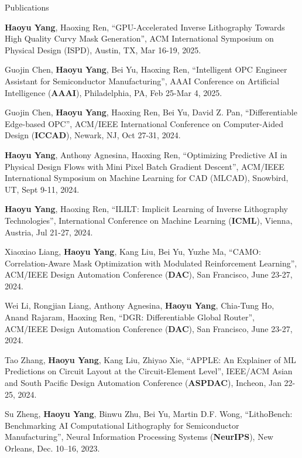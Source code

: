 \begin{rSection}{Publications}
\begin{description}[font=\normalfont]
	\item[{[C38]}] \textbf{Haoyu Yang}, Haoxing Ren, ``GPU-Accelerated Inverse Lithography Towards High Quality Curvy Mask Generation'', ACM International Symposium on Physical Design (ISPD), Austin, TX, Mar 16-19, 2025.
	
	\item[{[C37]}] Guojin Chen, \textbf{Haoyu Yang}, Bei Yu, Haoxing Ren, ``Intelligent OPC Engineer Assistant for Semiconductor Manufacturing'', AAAI Conference on Artificial Intelligence (\textbf{AAAI}), Philadelphia, PA, Feb 25-Mar 4, 2025.
	
	\item[{[C36]}] Guojin Chen, \textbf{Haoyu Yang}, Haoxing Ren, Bei Yu, David Z. Pan, ``Differentiable Edge-based OPC'', ACM/IEEE International Conference on Computer-Aided Design (\textbf{ICCAD}), Newark, NJ, Oct 27-31, 2024.
	
	\item[{[C35]}] \textbf{Haoyu Yang}, Anthony Agnesina, Haoxing Ren, ``Optimizing Predictive AI in Physical Design Flows with Mini Pixel Batch Gradient Descent'', ACM/IEEE International Symposium on Machine Learning for CAD (MLCAD), Snowbird, UT, Sept 9-11, 2024.
	
	\item[{[C34]}] \textbf{Haoyu Yang}, Haoxing Ren, ``ILILT: Implicit Learning of Inverse Lithography Technologies'', International Conference on Machine Learning (\textbf{ICML}), Vienna, Austria, Jul 21-27, 2024.
	
	\item[{[C33]}] Xiaoxiao Liang, \textbf{Haoyu Yang}, Kang Liu, Bei Yu, Yuzhe Ma, ``CAMO: Correlation-Aware Mask Optimization with Modulated Reinforcement Learning'', ACM/IEEE Design Automation Conference (\textbf{DAC}), San Francisco, June 23-27, 2024.
	
	\item[{[C32]}]	Wei Li, Rongjian Liang, Anthony Agnesina, \textbf{Haoyu Yang}, Chia-Tung Ho, Anand Rajaram, Haoxing Ren, ``DGR: Differentiable Global Router'', ACM/IEEE Design Automation Conference (\textbf{DAC}), San Francisco, June 23-27, 2024.
	
	\item[{[C31]}] Tao Zhang, \textbf{Haoyu Yang}, Kang Liu, Zhiyao Xie, ``APPLE: An Explainer of ML Predictions on Circuit Layout at the Circuit-Element Level'', IEEE/ACM Asian and South Pacific Design Automation Conference (\textbf{ASPDAC}), Incheon, Jan 22-25, 2024.
	
	
	\item[{[C30]}] Su Zheng, \textbf{Haoyu Yang}, Binwu Zhu, Bei Yu, Martin D.F. Wong, ``LithoBench: Benchmarking AI Computational Lithography for Semiconductor Manufacturing'', Neural Information Processing Systems (\textbf{NeurIPS}), New Orleans, Dec. 10–16, 2023.
	

\end{description}
\end{rSection}
